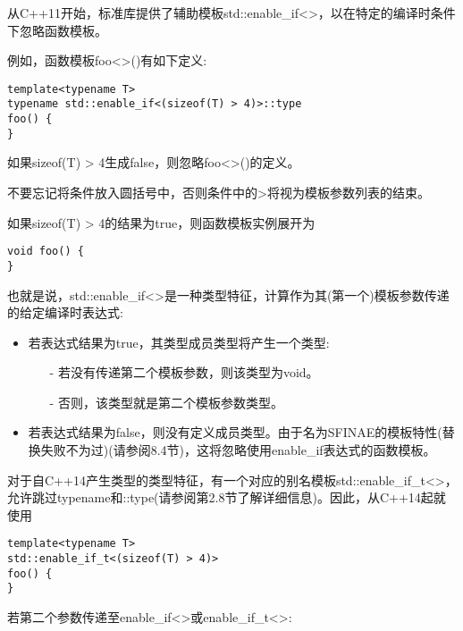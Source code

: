 从C++11开始，标准库提供了辅助模板std::enable\_if<>，以在特定的编译时条件下忽略函数模板。

例如，函数模板foo<>()有如下定义:

\begin{lstlisting}[style=styleCXX]
template<typename T>
typename std::enable_if<(sizeof(T) > 4)>::type
foo() {
}
\end{lstlisting}

如果sizeof(T) > 4生成false，则忽略foo<>()的定义。

\begin{tcolorbox}[colback=webgreen!5!white,colframe=webgreen!75!black]
\hspace*{0.75cm}不要忘记将条件放入圆括号中，否则条件中的>将视为模板参数列表的结束。
\end{tcolorbox}

如果sizeof(T) > 4的结果为true，则函数模板实例展开为

\begin{lstlisting}[style=styleCXX]
void foo() {
}
\end{lstlisting}

也就是说，std::enable\_if<>是一种类型特征，计算作为其(第一个)模板参数传递的给定编译时表达式:

\begin{itemize}
\item 
若表达式结果为true，其类型成员类型将产生一个类型:

\begin{itemize}
\item[-]
若没有传递第二个模板参数，则该类型为void。
	
\item[-]
否则，该类型就是第二个模板参数类型。
\end{itemize}

\item 
若表达式结果为false，则没有定义成员类型。由于名为SFINAE的模板特性(替换失败不为过)(请参阅8.4节)，这将忽略使用enable\_if表达式的函数模板。
\end{itemize}

对于自C++14产生类型的类型特征，有一个对应的别名模板std::enable\_if\_t<>，允许跳过typename和::type(请参阅第2.8节了解详细信息)。因此，从C++14起就使用

\begin{lstlisting}[style=styleCXX]
template<typename T>
std::enable_if_t<(sizeof(T) > 4)>
foo() {
}
\end{lstlisting}

若第二个参数传递至enable\_if<>或enable\_if\_t<>:

